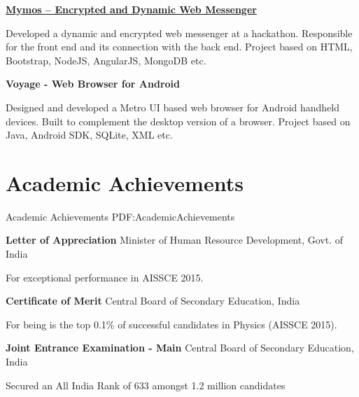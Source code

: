 \documentclass[letterpaper,10pt,oneside]{article}
\begin{document}
\begin{body}
\GapNoBreak

\BulletItem
\href{https://github.com/SomeRandomTeam/hackkings2015}{\textbf{Mymos – Encrypted and Dynamic Web Messenger}}
\hfill
{}
\begin{detail}
\GapNoBreak
\SubBulletItem
Developed a dynamic and encrypted web messenger at a hackathon.
\SubBulletItem
Responsible for the front end and its connection with the back end.
\SubBulletItem
Project based on HTML, Bootstrap, NodeJS, AngularJS, MongoDB etc.
\end{detail}

\GapNoBreak

\BulletItem
\textbf{Voyage - Web Browser for Android}
\hfill
{}
\begin{detail}
\GapNoBreak
\SubBulletItem
Designed and developed a Metro UI based web browser for Android handheld devices.
\SubBulletItem
Built to complement the desktop version of a browser.
\SubBulletItem
Project based on Java, Android SDK, SQLite, XML etc.
\end{detail}


\section
{Academic Achievements}
{Academic Achievements}
{PDF:AcademicAchievements}

\BulletItem
\textbf{Letter of Appreciation}
\hfill
{}
\newline
Minister of Human Resource Development,
Govt. of India
\begin{detail}
\SubItem
For exceptional performance in AISSCE 2015.
\end{detail}

\GapNoBreak

\BulletItem
\textbf{Certificate of Merit} 
\hfill
{}
\newline
Central Board of Secondary Education,
India
\begin{detail}
\SubItem
For being is the top 0.1\% of successful candidates in Physics (AISSCE 2015).
\end{detail}

\GapNoBreak

\BulletItem
\textbf{Joint Entrance Examination - Main}
\hfill
{}
\newline
Central Board of Secondary Education, India
\begin{detail}
\SubItem
Secured an All India Rank of 633 amongst 1.2 million candidates
\end{detail}


\end{body}
\end{document}
